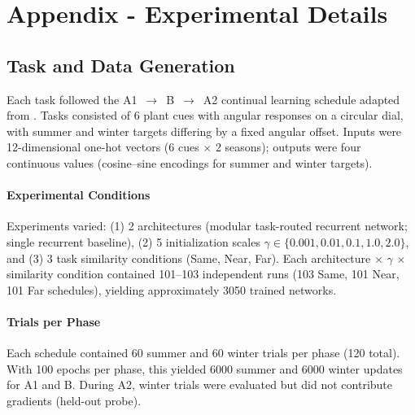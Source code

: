 \documentclass{article}
\theoremstyle{plain}
\theoremstyle{definition}
\theoremstyle{remark}
\begin{document}




\newpage
\appendix
\onecolumn

\section{Appendix - Experimental Details}\label{sec:appendix:experimental-details}

\subsection{Task and Data Generation}

Each task followed the A1~$\rightarrow$~B~$\rightarrow$~A2 continual learning schedule adapted from \citet{holton2025humans}. Tasks consisted of 6 plant cues with angular responses on a circular dial, with summer and winter targets differing by a fixed angular offset. Inputs were 12-dimensional one-hot vectors (6 cues $\times$ 2 seasons); outputs were four continuous values (cosine--sine encodings for summer and winter targets).

\paragraph{Experimental Conditions} Experiments varied: (1) 2 architectures (modular task-routed recurrent network; single recurrent baseline), (2) 5 initialization scales $\gamma \in \{0.001, 0.01, 0.1, 1.0, 2.0\}$, and (3) 3 task similarity conditions (Same, Near, Far). Each architecture $\times$ $\gamma$ $\times$ similarity condition contained 101--103 independent runs (103 Same, 101 Near, 101 Far schedules), yielding approximately 3050 trained networks.

\paragraph{Trials per Phase} Each schedule contained 60 summer and 60 winter trials per phase (120 total). With 100 epochs per phase, this yielded 6000 summer and 6000 winter updates for A1 and B. During A2, winter trials were evaluated but did not contribute gradients (held-out probe).
\end{document}
